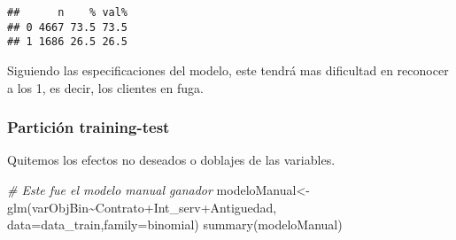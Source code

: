 \documentclass[
]{article}
\newenvironment{Shaded}{\begin{snugshade}}{\end{snugshade}}
\newcommand{\AttributeTok}[1]{\textcolor[rgb]{0.77,0.63,0.00}{#1}}
\newcommand{\CommentTok}[1]{\textcolor[rgb]{0.56,0.35,0.01}{\textit{#1}}}
\newcommand{\ConstantTok}[1]{\textcolor[rgb]{0.00,0.00,0.00}{#1}}
\newcommand{\DecValTok}[1]{\textcolor[rgb]{0.00,0.00,0.81}{#1}}
\newcommand{\FloatTok}[1]{\textcolor[rgb]{0.00,0.00,0.81}{#1}}
\newcommand{\FunctionTok}[1]{\textcolor[rgb]{0.00,0.00,0.00}{#1}}
\newcommand{\NormalTok}[1]{#1}
\newcommand{\OtherTok}[1]{\textcolor[rgb]{0.56,0.35,0.01}{#1}}
\newcommand{\SpecialCharTok}[1]{\textcolor[rgb]{0.00,0.00,0.00}{#1}}
\begin{document}
\begin{verbatim}
##      n    % val%
## 0 4667 73.5 73.5
## 1 1686 26.5 26.5
\end{verbatim}

Siguiendo las especificaciones del modelo, este tendrá mas dificultad en
reconocer a los 1, es decir, los clientes en fuga.

\hypertarget{particiuxf3n-training-test}{%
\subsubsection{Partición
training-test}\label{particiuxf3n-training-test}}

\begin{Shaded}
\end{Shaded}

Quitemos los efectos no deseados o doblajes de las variables.

\begin{Shaded}
\begin{Highlighting}[]
\CommentTok{\# Este fue el modelo manual ganador }
\NormalTok{modeloManual}\OtherTok{\textless{}{-}}\FunctionTok{glm}\NormalTok{(varObjBin}\SpecialCharTok{\textasciitilde{}}\NormalTok{Contrato}\SpecialCharTok{+}\NormalTok{Int\_serv}\SpecialCharTok{+}\NormalTok{Antiguedad,}
             \AttributeTok{data=}\NormalTok{data\_train,}\AttributeTok{family=}\NormalTok{binomial)}
\FunctionTok{summary}\NormalTok{(modeloManual)}
\end{Highlighting}
\end{Shaded}
\end{document}
